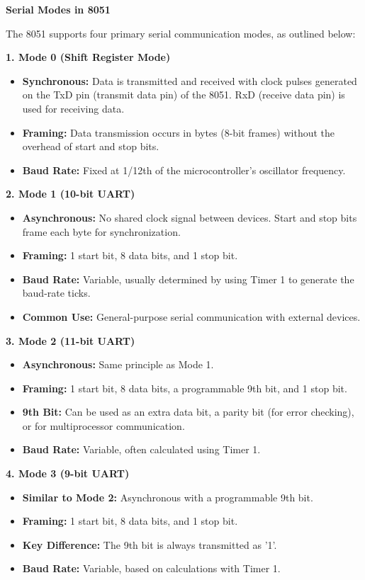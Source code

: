 \documentclass[
]{article}
\begin{document}
\textbf{Serial Modes in 8051}

The 8051 supports four primary serial communication modes, as outlined
below:

\textbf{1. Mode 0 (Shift Register Mode)}

\begin{itemize}
\item
  \textbf{Synchronous:} Data is transmitted and received with clock
  pulses generated on the TxD pin (transmit data pin) of the 8051. RxD
  (receive data pin) is used for receiving data.
\item
  \textbf{Framing:} Data transmission occurs in bytes (8-bit frames)
  without the overhead of start and stop bits.
\item
  \textbf{Baud Rate:} Fixed at 1/12th of the microcontroller's
  oscillator frequency.
\end{itemize}

\textbf{2. Mode 1 (10-bit UART)}

\begin{itemize}
\item
  \textbf{Asynchronous:} No shared clock signal between devices. Start
  and stop bits frame each byte for synchronization.
\item
  \textbf{Framing:} 1 start bit, 8 data bits, and 1 stop bit.
\item
  \textbf{Baud Rate:} Variable, usually determined by using Timer 1 to
  generate the baud-rate ticks.
\item
  \textbf{Common Use:} General-purpose serial communication with
  external devices.
\end{itemize}

\textbf{3. Mode 2 (11-bit UART)}

\begin{itemize}
\item
  \textbf{Asynchronous:} Same principle as Mode 1.
\item
  \textbf{Framing:} 1 start bit, 8 data bits, a programmable 9th bit,
  and 1 stop bit.
\item
  \textbf{9th Bit:} Can be used as an extra data bit, a parity bit (for
  error checking), or for multiprocessor communication.
\item
  \textbf{Baud Rate:} Variable, often calculated using Timer 1.
\end{itemize}

\textbf{4. Mode 3 (9-bit UART)}

\begin{itemize}
\item
  \textbf{Similar to Mode 2:} Asynchronous with a programmable 9th bit.
\item
  \textbf{Framing:} 1 start bit, 8 data bits, and 1 stop bit.
\item
  \textbf{Key Difference:} The 9th bit is always transmitted as '1'.
\item
  \textbf{Baud Rate:} Variable, based on calculations with Timer 1.
\end{itemize}
\end{document}
